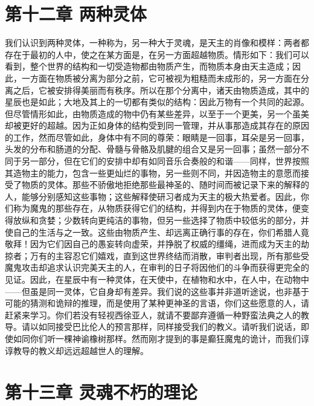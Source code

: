 \section{第十二章 两种灵体}

我们认识到两种灵体，一种称为，另一种大于灵魂，是天主的肖像和模样：两者都存在于最初的人中，使之在某方面是，在另一方面超越物质。情形如下：我们可以看到，整个世界的结构和一切受造物都由物质产生，而物质本身由天主造成；因此，一方面在物质被分离为部分之前，它可被视为粗糙而未成形的，另一方面在分离之后，它被安排得美丽而有秩序。所以在那个分离中，诸天由物质造成，其中的星辰也是如此；大地及其上的一切都有类似的结构：因此万物有一个共同的起源。但尽管情形如此，由物质造成的物中仍有某些差异，以至于一个更美，另一个虽美却被更好的超越。因为正如身体的结构受到同一管理，并从事那造成其存在的原因的工作，然而尽管如此，身体中有不同的尊荣：眼睛是一回事，耳朵是另一回事，头发的分布和肠道的分配、骨髓与骨骼及肌腱的组合又是另一回事；虽然一部分不同于另一部分，但在它们的安排中却有如同音乐合奏般的和谐——同样，世界按照其造物主的能力，包含一些更灿烂的事物，另一些则不同，并因造物主的意愿而接受了物质的灵体。那些不骄傲地拒绝那些最神圣的、随时间而被记录下来的解释的人，能够分别感知这些事物；这些解释使研习者成为天主的极大热爱者。因此，你们称为魔鬼的那些存在，从物质获得它们的结构，并得到内在于物质的灵体，便变得放纵和贪婪；少数转向更纯洁的事物，但另一些选择了物质中较低劣的部分，并使自己的生活与之一致。这些由物质产生、却远离正确行事的存在，你们希腊人竟敬拜！因为它们因自己的愚妄转向虚荣，并挣脱了权威的缰绳，进而成为天主的劫掠者；万有的主容忍它们嬉戏，直到这世界终结而消散，审判者出现，所有那些受魔鬼攻击却追求认识完美天主的人，在审判的日子将因他们的斗争而获得更完全的见证。因此，在星辰中有一种灵体，在天使中，在植物和水中，在人中，在动物中——但虽是同一灵体，它自身却有差异。我们说的这些事并非道听途说，也非基于可能的猜测和诡辩的推理，而是使用了某种更神圣的言语，你们这些愿意的人，请赶紧来学习。你们若没有轻视西徐亚人，就请不要鄙弃遵循一种野蛮法典之人的教导。请以如同接受巴比伦人的预言那样，同样接受我们的教义。请听我们说话，即使如同你们听一棵神谕橡树那样。然而刚才提到的事是癫狂魔鬼的诡计，而我们谆谆教导的教义却远远超越世人的理解。\par


\section{第十三章 灵魂不朽的理论}

